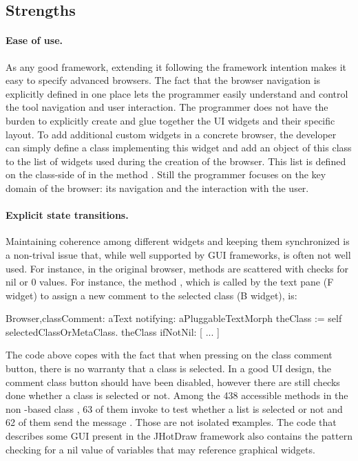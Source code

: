 \documentclass[a4paper,10pt,twoside]{book}
\begin{document}
\subsection{Strengths}

\paragraph{Ease of use.}
As any good framework, extending it following the framework intention makes it easy to specify advanced browsers. The fact that the browser navigation is explicitly defined in one place lets the programmer easily understand and control the tool navigation and user interaction. The programmer does not have the burden to explicitly create and glue together the UI widgets and their specific layout. To add additional custom widgets in a concrete browser, the developer can simply define a class implementing this widget and add an object of this class to the list of widgets used during the creation of the browser. This list is defined on the class-side of  in the method . Still the programmer focuses on the key domain of the browser: its navigation and the interaction with the user. 

\paragraph{Explicit state transitions.} Maintaining coherence among different widgets and keeping them synchronized is a non-trival issue that, while well supported by GUI frameworks,  is often not well used. For instance, in the original \pharo browser, methods are scattered with checks for nil or 0 values. For instance, the method , which is called by the text pane (F widget) to assign a new comment to the selected class (B widget), is:

\begin{code}
Browser\sep{}classComment: aText notifying: aPluggableTextMorph 
    theClass := self selectedClassOrMetaClass.
    theClass
        ifNotNil: [ ... ]
\end{code}

The code above copes with the fact that when pressing on the class comment button, there is no warranty that a class is selected. In a good UI design, the comment class button should have been disabled, however there are still checks done whether a class is selected or not. Among the 438 accessible methods in the non \ob-based \pharo class , 63 of them invoke  to test whether a list is selected or not and 62 of them send the message . Those are not isolated \st examples. The code that describes some GUI present in the JHotDraw framework also contains the pattern checking for a nil value of variables that may reference graphical widgets. 
\end{document}
